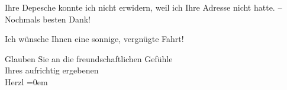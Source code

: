 \pstart
           Ihre Depesche konnte ich nicht erwidern, weil ich Ihre Adresse nicht hatte. –
               Nochmals besten Dank!\pend
           
\pstart
           Ich wünsche Ihnen eine sonnige, vergnügte Fahrt!\pend
           
\pstart
           Glauben Sie an die freundschaftlichen Gefühle{\\[\baselineskip]}Ihres aufrichtig ergebenen{\\[\baselineskip]}\spacefill\mbox{Herzl}\pend
           \leftskip=0em{}\endnumbering{}  \newcommand{\dateiname}{L03821}\newcommand{\titel}{Theodor Herzl an Arthur Schnitzler, 14. 8. 1885}\newcommand{\editorInnen}{Selma Jahnke und Martin Anton Müller}
